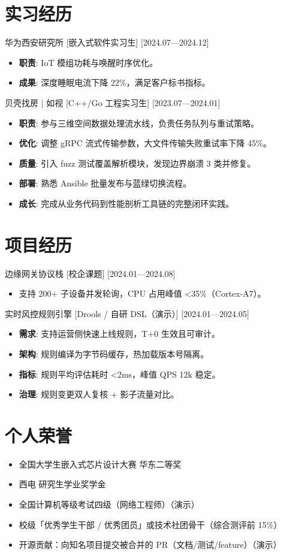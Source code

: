 \documentclass{resume-photo}
\begin{document}
\section{实习经历}
\ResumeItem
{华为西安研究所}
[\textnormal{嵌入式软件实习生}]
[2024.07—2024.12]

\begin{itemize}
  \item \textbf{职责}: IoT 模组功耗与唤醒时序优化。
  \item \textbf{成果}: 深度睡眠电流下降 22\%，满足客户标书指标。
\end{itemize}


\ResumeItem
{贝壳找房 | 如视}
[\textnormal{C++/Go 工程实习生}]
[2023.07—2024.01]

\begin{itemize}
  \item \textbf{职责}: 参与三维空间数据处理流水线，负责任务队列与重试策略。
  \item \textbf{优化}: 调整 gRPC 流式传输参数，大文件传输失败重试率下降 45\%。
  \item \textbf{质量}: 引入 fuzz 测试覆盖解析模块，发现边界崩溃 3 类并修复。
  \item \textbf{部署}: 熟悉 Ansible 批量发布与蓝绿切换流程。
  \item \textbf{成长}: 完成从业务代码到性能剖析工具链的完整闭环实践。
\end{itemize}



\section{项目经历}
\ResumeItem
{边缘网关协议栈}
[\textnormal{校企课题}]
[2024.01—2024.08]

\begin{itemize}
  \item 支持 200+ 子设备并发轮询，CPU 占用峰值 <35\%（Cortex-A7）。
\end{itemize}


\ResumeItem
{实时风控规则引擎}
[\textnormal{Drools / 自研 DSL（演示）}]
[2024.01—2024.05]

\begin{itemize}
  \item \textbf{需求}: 支持运营侧快速上线规则，T+0 生效且可审计。
  \item \textbf{架构}: 规则编译为字节码缓存，热加载版本号隔离。
  \item \textbf{指标}: 规则平均评估耗时 <2ms，峰值 QPS 12k 稳定。
  \item \textbf{治理}: 规则变更双人复核 + 影子流量对比。
\end{itemize}



\section{个人荣誉}
\begin{itemize}
  \item 全国大学生嵌入式芯片设计大赛 华东二等奖
  \item 西电 研究生学业奖学金
  \item 全国计算机等级考试四级（网络工程师）（演示）
  \item 校级「优秀学生干部 / 优秀团员」或技术社团骨干（综合测评前 15\%）
  \item 开源贡献：向知名项目提交被合并的 PR（文档/测试/feature）（演示）
\end{itemize}
\end{document}
